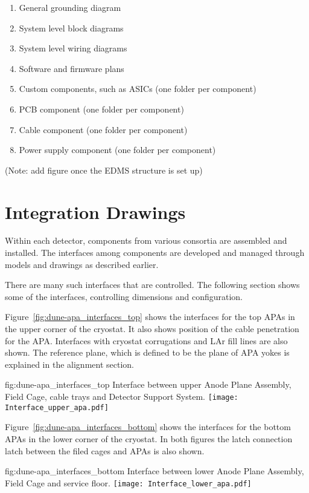 \begin{enumerate}
\begin{enumerate}
   \item General grounding diagram
   \item System level block diagrams
   \item System level wiring diagrams
   \item Software and firmware plans
   \item Custom components, such as ASICs (one folder per component)
   \item PCB component (one folder per component)
   \item Cable component (one folder per component)
   \item Power supply component (one folder per component)
 \end{enumerate}
\end{enumerate}
(Note: add figure once the EDMS structure is set up)



\section{Integration Drawings}
\label{sec:fdsp-coord-integ-drawings}
Within each detector, components from various consortia are assembled
and installed. The interfaces among components are developed and
managed through models and drawings as described earlier.

There are many such interfaces that are controlled. The following
section shows some of the interfaces, controlling dimensions and
configuration.

Figure~\ref{fig:dune-apa_interfaces_top} shows the interfaces for the
top APAs in the upper corner of the cryostat. It also shows position
of the cable penetration for the APA. Interfaces with cryostat
corrugations and LAr fill lines are also shown. The reference plane,
which is defined to be the plane of APA yokes is explained in the
alignment section.
\begin{dunefigure}{fig:dune-apa_interfaces_top}
  {Interface between upper Anode Plane Assembly, Field Cage, cable trays and Detector Support System.}
  \texttt{[image: Interface\_upper\_apa.pdf]}
\end{dunefigure}

Figure~\ref{fig:dune-apa_interfaces_bottom} shows the interfaces for
the bottom APAs in the lower corner of the cryostat. In both figures
the latch connection latch between the filed cages and APAs is also
shown.
\begin{dunefigure}{fig:dune-apa_interfaces_bottom}
  {Interface between lower Anode Plane Assembly, Field Cage and
    service floor.}
  \texttt{[image: Interface\_lower\_apa.pdf]}
\end{dunefigure}

